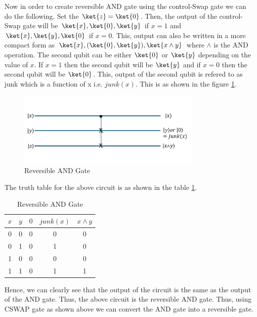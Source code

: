 \documentclass[12pt, oneside]{book}
\theoremstyle{definition}
\theoremstyle{definition}
\theoremstyle{remark}
\begin{document}
Now in order to create reversible AND gate using the control-Swap gate we can do the following. Set the $\ket{z}=\ket{0}$.
Then, the output of the control-Swap gate will be $\ket{x},\ket{0},\ket{y}$ if $x=1$ and $\ket{x},\ket{y},\ket{0}$ if $x=0$.
This, output can also be written in a more compact form as $\ket{x},(\ket{0},\ket{y}),\ket{x \land y}$ where $\land$ is the AND operation. The second qubit can be either $\ket{0}$ or $\ket{y}$ depending on the value of $x$.
If $x=1$ then the second qubit will be $\ket{y}$ and if $x=0$ then the second qubit will be $\ket{0}$. This, output of the second qubit is refered to as junk which is a function of x i.e. $junk(x)$. This is as shown in the figure \ref{fig:reversibleand}.
\begin{figure}[H]
    \centering
    \includegraphics[width=0.8\textwidth]{../images/reversibleand.png}
    \caption{Reversible AND Gate}
    \label{fig:reversibleand}
\end{figure}
The truth table for the above circuit is as shown in the table \ref{tab:reversibleand}.
\begin{table}[H]
    \centering
    \begin{tabular}{|c|c|c|c|c|}
        \hline
        $x$ & $y$ & $0$ & $junk(x)$ & $x \land y$ \\
        \hline
        0 & 0 & 0 & 0 & 0 \\
        0 & 1 & 0 & 1 & 0 \\
        1 & 0 & 0 & 0 & 0 \\
        1 & 1 & 0 & 1 & 1 \\
        \hline
    \end{tabular}
    \caption{Reversible AND Gate}
    \label{tab:reversibleand}
\end{table}
Hence, we can clearly see that the output of the circuit is the same as the output of the AND gate. Thus, the above circuit is the reversible AND gate. 
Thus, using CSWAP gate as shown above we can convert the AND gate into a reversible gate. 
\end{document}
